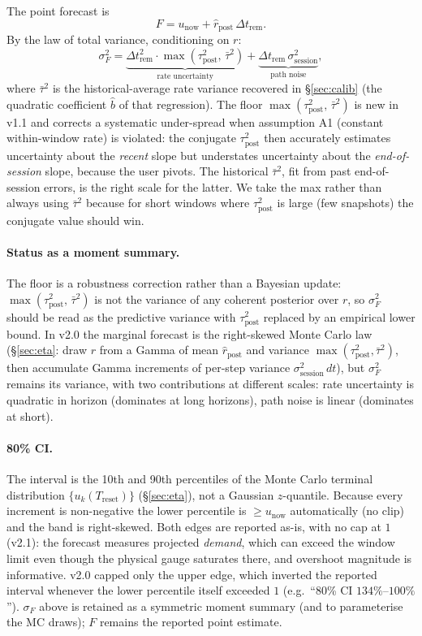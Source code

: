 \documentclass[11pt]{article}
\newcommand{\rpost}{\hat r_{\text{post}}}
\newcommand{\taupostsq}{\tau_{\text{post}}^2}
\newcommand{\sigsessionsq}{\sigma_{\text{session}}^2}
\newcommand{\unow}{u_{\text{now}}}
\newcommand{\Treset}{T_{\text{reset}}}
\newcommand{\Dtrem}{\Delta t_{\text{rem}}}
\begin{document}
The point forecast is
\[
  F = \unow + \rpost\,\Dtrem.
\]
By the law of total variance, conditioning on $r$:
\[
  \sigma_F^2 = \underbrace{\Dtrem^2 \cdot \max(\taupostsq,\, \bar\tau^2)}_{\text{rate uncertainty}}
            + \underbrace{\Dtrem\,\sigsessionsq}_{\text{path noise}},
\]
where $\bar\tau^2$ is the historical-average rate variance recovered in
\S\ref{sec:calib} (the quadratic coefficient $\hat b$ of that regression). The floor
$\max(\taupostsq,\, \bar\tau^2)$ is new in v1.1 and corrects a systematic
under-spread when assumption A1 (constant within-window rate) is violated:
the conjugate $\taupostsq$ then accurately estimates uncertainty about the
\emph{recent} slope but understates uncertainty about the
\emph{end-of-session} slope, because the user pivots. The historical $\bar\tau^2$,
fit from past end-of-session errors, is the right scale for the latter. We
take the max rather than always using $\bar\tau^2$ because for short windows
where $\taupostsq$ is large (few snapshots) the conjugate value should win.

\paragraph{Status as a moment summary.} The floor is a robustness correction
rather than a Bayesian update: $\max(\taupostsq,\, \bar\tau^2)$ is not the
variance of any coherent posterior over $r$, so $\sigma_F^2$ should be read as
the predictive variance with $\taupostsq$ replaced by an empirical lower bound.
In v2.0 the marginal forecast is the right-skewed Monte Carlo law (\S\ref{sec:eta}: draw
$r$ from a Gamma of mean $\rpost$ and variance $\max(\taupostsq,\bar\tau^2)$,
then accumulate Gamma increments of per-step variance $\sigsessionsq\,dt$), but
$\sigma_F^2$ remains its variance, with two contributions at different scales:
rate uncertainty is quadratic in horizon (dominates at long horizons), path
noise is linear (dominates at short).

\paragraph{80\% CI.} The interval is the 10th and 90th percentiles of the Monte
Carlo terminal distribution $\{u_k(\Treset)\}$ (\S\ref{sec:eta}), not a Gaussian
$z$-quantile. Because every increment is non-negative the lower percentile is
$\ge \unow$ automatically (no clip) and the band is right-skewed. Both edges
are reported as-is, with no cap at $1$ (v2.1): the forecast measures projected
\emph{demand}, which can exceed the window limit even though the physical
gauge saturates there, and overshoot magnitude is informative. v2.0 capped
only the upper edge, which inverted the reported interval whenever the lower
percentile itself exceeded $1$ (e.g.\ ``80\% CI $134\%$--$100\%$'').
$\sigma_F$ above is retained as a symmetric moment summary (and to
parameterise the MC draws); $F$ remains the reported point estimate.
\end{document}

